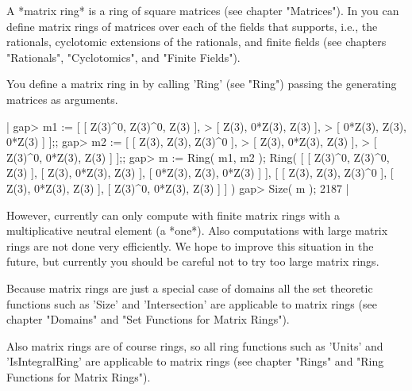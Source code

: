 
A *matrix ring* is a ring  of square matrices  (see chapter  "Matrices").
In {\GAP} you can define matrix rings of matrices over each of the fields
that {\GAP} supports, i.e., the  rationals,  cyclotomic extensions of the
rationals,  and  finite fields (see chapters  "Rationals", "Cyclotomics",
and "Finite Fields").

You define a matrix ring in {\GAP} by calling 'Ring' (see "Ring") passing
the generating matrices as arguments.

|    gap> m1 := [ [ Z(3)^0, Z(3)^0,   Z(3) ],
    >            [   Z(3), 0*Z(3),   Z(3) ],
    >            [ 0*Z(3),   Z(3), 0*Z(3) ] ];;
    gap> m2 := [ [   Z(3),   Z(3), Z(3)^0 ],
    >            [   Z(3), 0*Z(3),   Z(3) ],
    >            [ Z(3)^0, 0*Z(3),   Z(3) ] ];;
    gap> m := Ring( m1, m2 );
    Ring( [ [ Z(3)^0, Z(3)^0, Z(3) ], [ Z(3), 0*Z(3), Z(3) ],
      [ 0*Z(3), Z(3), 0*Z(3) ] ],
    [ [ Z(3), Z(3), Z(3)^0 ], [ Z(3), 0*Z(3), Z(3) ],
      [ Z(3)^0, 0*Z(3), Z(3) ] ] )
    gap> Size( m );
    2187 |

However, currently {\GAP} can only compute with finite matrix rings  with
a multiplicative neutral element (a *one*).  Also computations with large
matrix  rings are not  done  very  efficiently.  We  hope to improve this
situation in  the future, but currently you should be careful  not to try
too large matrix rings.

Because matrix  rings are  just a special case  of  domains all  the  set
theoretic  functions such as 'Size' and 'Intersection'  are applicable to
matrix  rings  (see chapter  "Domains"  and  "Set  Functions  for  Matrix
Rings").

Also  matrix rings are of  course rings,  so  all ring functions such  as
'Units' and 'IsIntegralRing' are applicable to matrix rings (see  chapter
"Rings" and "Ring Functions for Matrix Rings").

